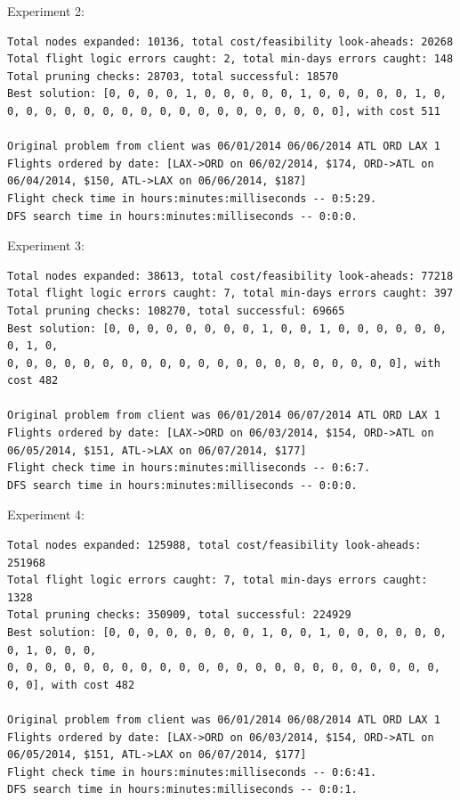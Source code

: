 \documentclass{article}
\begin{document}
Experiment 2:

\scriptsize
\begin{verbatim}
Total nodes expanded: 10136, total cost/feasibility look-aheads: 20268
Total flight logic errors caught: 2, total min-days errors caught: 148
Total pruning checks: 28703, total successful: 18570
Best solution: [0, 0, 0, 0, 1, 0, 0, 0, 0, 0, 1, 0, 0, 0, 0, 0, 1, 0,
0, 0, 0, 0, 0, 0, 0, 0, 0, 0, 0, 0, 0, 0, 0, 0, 0, 0], with cost 511

Original problem from client was 06/01/2014 06/06/2014 ATL ORD LAX 1
Flights ordered by date: [LAX->ORD on 06/02/2014, $174, ORD->ATL on 06/04/2014, $150, ATL->LAX on 06/06/2014, $187]
Flight check time in hours:minutes:milliseconds -- 0:5:29.
DFS search time in hours:minutes:milliseconds -- 0:0:0.
\end{verbatim}
\normalsize

Experiment 3:

\scriptsize
\begin{verbatim}
Total nodes expanded: 38613, total cost/feasibility look-aheads: 77218
Total flight logic errors caught: 7, total min-days errors caught: 397
Total pruning checks: 108270, total successful: 69665
Best solution: [0, 0, 0, 0, 0, 0, 0, 0, 1, 0, 0, 1, 0, 0, 0, 0, 0, 0, 0, 1, 0,
0, 0, 0, 0, 0, 0, 0, 0, 0, 0, 0, 0, 0, 0, 0, 0, 0, 0, 0, 0, 0], with cost 482

Original problem from client was 06/01/2014 06/07/2014 ATL ORD LAX 1
Flights ordered by date: [LAX->ORD on 06/03/2014, $154, ORD->ATL on 06/05/2014, $151, ATL->LAX on 06/07/2014, $177]
Flight check time in hours:minutes:milliseconds -- 0:6:7.
DFS search time in hours:minutes:milliseconds -- 0:0:0.
\end{verbatim}
\normalsize

Experiment 4:

\scriptsize
\begin{verbatim}
Total nodes expanded: 125988, total cost/feasibility look-aheads: 251968
Total flight logic errors caught: 7, total min-days errors caught: 1328
Total pruning checks: 350909, total successful: 224929
Best solution: [0, 0, 0, 0, 0, 0, 0, 0, 1, 0, 0, 1, 0, 0, 0, 0, 0, 0, 0, 1, 0, 0, 0,
0, 0, 0, 0, 0, 0, 0, 0, 0, 0, 0, 0, 0, 0, 0, 0, 0, 0, 0, 0, 0, 0, 0, 0, 0], with cost 482

Original problem from client was 06/01/2014 06/08/2014 ATL ORD LAX 1
Flights ordered by date: [LAX->ORD on 06/03/2014, $154, ORD->ATL on 06/05/2014, $151, ATL->LAX on 06/07/2014, $177]
Flight check time in hours:minutes:milliseconds -- 0:6:41.
DFS search time in hours:minutes:milliseconds -- 0:0:1.
\end{verbatim}
\normalsize
\end{document}
